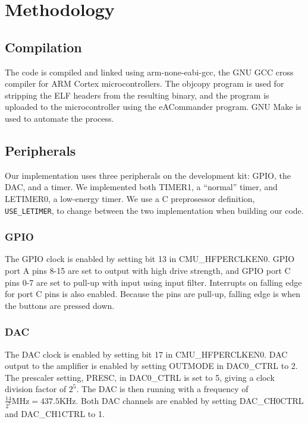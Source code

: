 \chapter{Methodology}
\section{Compilation}
The code is compiled and linked using arm-none-eabi-gcc, the GNU GCC cross compiler for ARM Cortex microcontrollers. The objcopy program is used for stripping the ELF headers from the resulting binary, and the program is uploaded to the microcontroller using the eACommander program. GNU Make is used to automate the process.

\section{Peripherals}
Our implementation uses three peripherals on the development kit: GPIO, the DAC, and a timer. We implemented both TIMER1, a ``normal'' timer, and LETIMER0, a low-energy timer. We use a C preprosessor definition, \texttt{USE\_LETIMER}, to change between the two implementation when building our code.

\subsection{GPIO}
The GPIO clock is enabled by setting bit 13 in CMU\_HFPERCLKEN0. GPIO port A pins 8-15 are set to output with high drive strength, and GPIO port C pins 0-7 are set to pull-up with input using input filter. Interrupts on falling edge for port C pins is also enabled. Because the pins are pull-up, falling edge is when the buttons are pressed down.

\subsection{DAC}
The DAC clock is enabled by setting bit 17 in CMU\_HFPERCLKEN0. DAC output to the amplifier is enabled by setting OUTMODE in DAC0\_CTRL to 2. The prescaler setting, PRESC, in DAC0\_CTRL is set to 5, giving a clock division factor of $2^5$. The DAC is then running with a frequency of $\frac{14}{2^5}\mathrm{MHz} = 437.5\mathrm{KHz}$. Both DAC channels are enabled by setting DAC\_CH0CTRL and  DAC\_CH1CTRL to 1.

